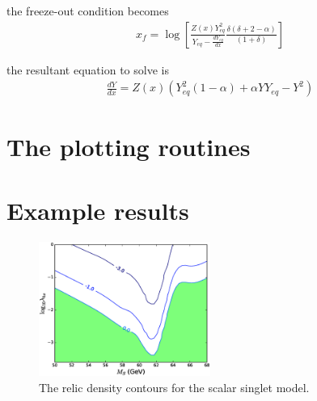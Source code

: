 the freeze-out condition becomes
\begin{align}
x_f=\log \left[ \frac{Z(x) Y_{eq}^2}{Y_{eq}-\frac{d Y_{eq}}{dx}} \frac{\delta (\delta+2-\alpha)}{(1+\delta)}\right]
\end{align}



the resultant equation to solve is
\begin{align}
\frac{dY}{dx}=Z(x)(Y_{eq}^2(1-\alpha)+\alpha Y Y_{eq}-Y^2)
\end{align}





\section{The plotting routines}



\section{Example results}
\begin{figure}
\includegraphics[width=0.5\textwidth]{relic_density.eps}
\caption{The relic density contours for the scalar singlet model.}\label{fig:rd_scan}
\end{figure}





{}


  